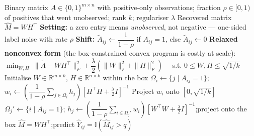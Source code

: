 \documentclass{article}
\begin{document}
\begin{algorithm}[!h]
\renewcommand{\algorithmicrequire}{\textbf{Input:}}
\renewcommand{\algorithmicensure}{\textbf{Output:}}
	\caption{ShiftMC: PU matrix completion by shifting the observed matrix}
	\begin{algorithmic}[1]
	    \REQUIRE
	    Binary matrix $A\in\{0,1\}^{m\times n}$ with positive-only observations;
	    fraction $\rho\in[0,1)$ of positives that went unobserved;
	    rank $k$; regulariser $\lambda$
	    \ENSURE
	    Recovered matrix $\hat{M}=WH^{\top}$
	    \STATE \textbf{Setting:} a zero entry means \emph{unobserved}, not negative --- one-sided
	    label noise with rate $\rho$ %
	    \STATE \textbf{Shift:} $\tilde{A}_{ij}\leftarrow \dfrac{1}{1-\rho}$ if $A_{ij}=1$,
	    else $\tilde{A}_{ij}\leftarrow 0$ %
	    \STATE \textbf{Relaxed nonconvex form} (the box-constrained convex program is costly at scale):
	    \STATE \quad $\min_{W,H}\ \|\tilde{A}-WH^{\top}\|_{F}^{2}
	    +\dfrac{\lambda}{2}\left(\|W\|_{F}^{2}+\|H\|_{F}^{2}\right)$
	    \ \ s.t. $0\leq W,H\leq\sqrt{1/k}$ %
	    \STATE Initialise $W\in\mathbb{R}^{m\times k}$, $H\in\mathbb{R}^{n\times k}$ within the box
	    \STATE $\Omega_{i}\leftarrow\{j\mid A_{ij}=1\}$;\quad
	    $w_{i}\leftarrow \left(\dfrac{1}{1-\rho}\sum_{j\in\Omega_{i}}h_{j}\right)
	    \left[H^{\top}H+\tfrac{\lambda}{2}I\right]^{-1}$ %
	    \STATE Project $w_{i}$ onto $[0,\sqrt{1/k}]$
	    \ENDFOR
	    \STATE $\Omega_{j}'\leftarrow\{i\mid A_{ij}=1\}$;\quad
	    $h_{j}\leftarrow \left(\dfrac{1}{1-\rho}\sum_{i\in\Omega_{j}'}w_{i}\right)
	    \left[W^{\top}W+\tfrac{\lambda}{2}I\right]^{-1}$;\quad project onto the box
	    \ENDFOR
	    \ENDFOR
		\RETURN $\hat{M}=WH^{\top}$;\quad predict $\hat{Y}_{ij}=\mathbb{I}(\hat{M}_{ij}>q)$
	\end{algorithmic}
\end{algorithm}
\end{document}
